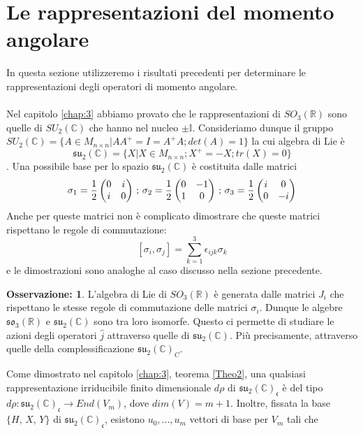 \documentclass[12pt,a4paper]{report}
\theoremstyle{definition}
\theoremstyle{Theorem}
\theoremstyle{definition}
\theoremstyle{definition}
\theoremstyle{definition}
\newtheorem{Obs}[Def]{Osservazione:}
\begin{document}
\section{Le rappresentazioni del momento angolare}
In questa sezione utilizzeremo i risultati precedenti per determinare le rappresentazioni degli operatori di momento angolare.\\
\\
Nel capitolo \ref{chap:3} abbiamo provato che le rappresentazioni di $SO_3(\mathbb{R})$ sono quelle di $SU_2(\mathbb{C})$ che hanno nel nucleo $\pm\mathbb{I}$.
Consideriamo dunque il gruppo $SU_2(\mathbb{C})=\{A\in M_{n\times n}|AA^{+}=I=A^{+}A;det(A)=1\}$ la cui algebra di Lie è $$\mathfrak{su_2(\mathbb{C})}=\{X|X\in M_{n\times n} ;X^{+}=-X;tr(X)=0\}$$.
Una possibile base per lo spazio $\mathfrak{su_2(\mathbb{C})}$ è costituita dalle matrici
$$
\sigma_1={1\over2}\begin{pmatrix}
	0 &i\\
	i &0\\
\end{pmatrix}\,;\,
\sigma_2={1\over2}\begin{pmatrix}
	0 &-1\\
	1 &0\\
\end{pmatrix}\,;\,
\sigma_3={1\over2}\begin{pmatrix}
	i &0\\
	0 &-i\\
\end{pmatrix}
$$
Anche per queste matrici non è complicato dimostrare che queste matrici rispettano le regole di commutazione:
$$[\sigma_i,\sigma_j]=\sum_{k=1}^{3}\epsilon_{ijk}\sigma_k$$ e le dimostrazioni sono analoghe al caso discusso nella sezione precedente.
\begin{Obs}
	L'algebra di Lie di $SO_3(\mathbb{R})$ è generata dalle matrici $J_i$ che rispettano le stesse regole di commutazione delle matrici $\sigma_i$. Dunque le algebre $\mathfrak{so_3}(\mathbb{R})$ e $\mathfrak{su_2(\mathbb{C})}$ sono tra loro isomorfe. Questo ci permette di studiare le azioni degli operatori $\hat{j}$ attraverso quelle di $\mathfrak{su_2(\mathbb{C})}$. Più precisamente, attraverso quelle della complessificazione $\mathfrak{su_2(\mathbb{C})}_C$.
\end{Obs}
Come dimostrato nel capitolo \ref{chap:3}, teorema \ref{Theo2}, una qualsiasi rappresentazione irriducibile finito dimensionale $d\rho$ di $\mathfrak{su_2(\mathbb{C})_c}$ è del tipo $d\rho: \mathfrak{su_2(\mathbb{C})_c}\rightarrow End(V_m)$, dove $dim(V)=m+1$. Inoltre, fissata la base $\{H,\, X,\, Y\}$ di $\mathfrak{su_2(\mathbb{C})_c}$, esistono $u_0,...,u_m$ vettori di base per $V_m$ tali che
\end{document}
